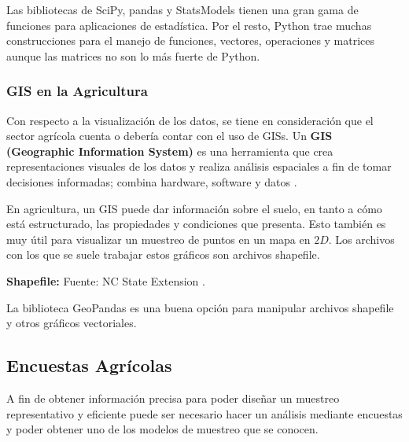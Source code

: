 \documentclass[conference]{IEEEtran}
\begin{document}
Las bibliotecas de SciPy, pandas y StatsModels tienen una gran gama de funciones para aplicaciones de estadística. Por el resto, Python trae muchas construcciones para el manejo de funciones, vectores, operaciones y matrices aunque las matrices no son lo más fuerte de Python.

\subsubsection{GIS en la Agricultura}

Con respecto a la visualización de los datos, se tiene en consideración que el sector agrícola cuenta o debería contar con el uso de GISs. Un \textbf{GIS (Geographic Information System)} es una herramienta que crea representaciones visuales de los datos y realiza análisis espaciales a fin de tomar decisiones informadas; combina hardware, software y datos \cite{hammonds-2019}.

\bigbreak

En agricultura, un GIS puede dar información sobre el suelo, en tanto a cómo está estructurado, las propiedades y condiciones que presenta. Esto también es muy útil para visualizar un muestreo de puntos en un mapa en $2D$. Los archivos con los que se suele trabajar estos gráficos son archivos shapefile.

\bigbreak

\textbf{Shapefile:}  Fuente: NC State Extension \cite{nc-state-extension-2021}.

\bigbreak

La biblioteca GeoPandas es una buena opción para manipular archivos shapefile y otros gráficos vectoriales.

\subsection{Encuestas Agrícolas}

A fin de obtener información precisa para poder diseñar un muestreo representativo y eficiente puede ser necesario hacer un análisis mediante encuestas y poder obtener uno de los modelos de muestreo que se conocen.
\end{document}
